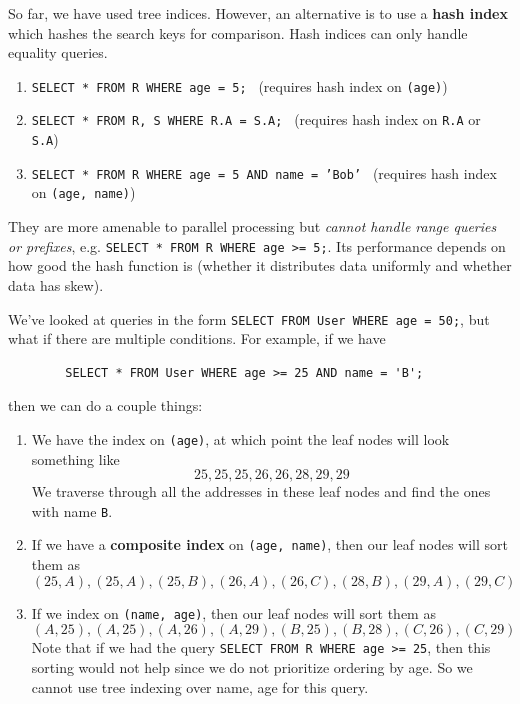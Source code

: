 \documentclass{article}
\begin{document}
    \begin{definition}
      So far, we have used tree indices. However, an alternative is to use a \textbf{hash index} which hashes the search keys for comparison. Hash indices can only handle equality queries. 
      \begin{enumerate}
        \item \texttt{SELECT * FROM R WHERE age = 5; } (requires hash index on \texttt{(age)})
        \item \texttt{SELECT * FROM R, S WHERE R.A = S.A; } (requires hash index on \texttt{R.A} or \texttt{S.A})
        \item \texttt{SELECT * FROM R WHERE age = 5 AND name = 'Bob' } (requires hash index on \texttt{(age, name)})
      \end{enumerate}
      They are more amenable to parallel processing but \textit{cannot handle range queries or prefixes}, e.g. \texttt{SELECT * FROM R WHERE age >= 5;}. Its performance depends on how good the hash function is (whether it distributes data uniformly and whether data has skew). 
    \end{definition}

    \begin{definition}
      We've looked at queries in the form \texttt{SELECT \* FROM User WHERE age = 50;}, but what if there are multiple conditions. For example, if we have 
      \begin{lstlisting}
        SELECT * FROM User WHERE age >= 25 AND name = 'B'; 
      \end{lstlisting}
      then we can do a couple things: 
      \begin{enumerate}
        \item We have the index on \texttt{(age)}, at which point the leaf nodes will look something like 
          \begin{equation}
            25, 25, 25, 26, 26, 28, 29, 29
          \end{equation}
          We traverse through all the addresses in these leaf nodes and find the ones with name \texttt{B}. 

        \item If we have a \textbf{composite index} on \texttt{(age, name)}, then our leaf nodes will sort them as 
          \begin{equation}
            (25, A), (25, A), (25, B), (26, A), (26, C), (28, B), (29, A), (29, C)
          \end{equation}

        \item If we index on \texttt{(name, age)}, then our leaf nodes will sort them as 
          \begin{equation}
            (A, 25), (A, 25), (A, 26), (A, 29), (B, 25), (B, 28), (C, 26), (C, 29)
          \end{equation}
          Note that if we had the query \texttt{SELECT \* FROM R WHERE age >= 25}, then this sorting would not help since we do not prioritize ordering by age. So we cannot use tree indexing over name, age for this query. 
      \end{enumerate}
    \end{definition}
\end{document}
